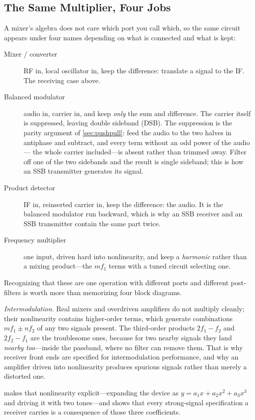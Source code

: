 \subsection{The Same Multiplier, Four Jobs}
A mixer's algebra does not care which port you call which, so the same circuit
appears under four names depending on what is connected and what is kept:
\begin{description}
\item[Mixer / converter] RF in, local oscillator in, keep the difference: translate
a signal to the IF. The receiving case above.
\item[Balanced modulator] audio in, carrier in, and keep \emph{only} the sum and
difference. The carrier itself is suppressed, leaving double sideband (DSB). The
suppression is the parity argument of \cref{sec:pushpull}: feed the audio to the two
halves in antiphase and subtract, and every term without an odd power of the audio---
the whole carrier included---is absent rather than trimmed away. Filter off one of the
two sidebands and the result is single sideband; this is how an SSB transmitter
generates its signal.
\item[Product detector] IF in, reinserted carrier in, keep the difference: the
audio. It is the balanced modulator run backward, which is why an SSB receiver and
an SSB transmitter contain the same part twice.
\item[Frequency multiplier] one input, driven hard into nonlinearity, and keep a
\emph{harmonic} rather than a mixing product---the \(m f_1\) terms with a tuned
circuit selecting one.
\end{description}
Recognizing that these are one operation with different ports and different
post-filters is worth more than memorizing four block diagrams.

\emph{Intermodulation.} Real mixers and overdriven amplifiers do not multiply cleanly;
their nonlinearity contains higher-order terms, which generate combinations
\(m f_1\pm n f_2\) of any two signals present. The third-order products
\(2f_1-f_2\) and \(2f_2-f_1\) are the troublesome ones, because for two nearby
signals they land \emph{nearby too}---inside the passband, where no filter can remove
them. That is why receiver front ends are specified for intermodulation
performance, and why an amplifier driven into nonlinearity produces spurious signals
rather than merely a distorted one.

 makes that nonlinearity explicit---expanding the device as
\(y=a_1x+a_2x^2+a_3x^3\) and driving it with two tones---and shows that every
strong-signal specification a receiver carries is a consequence of those three
coefficients.

